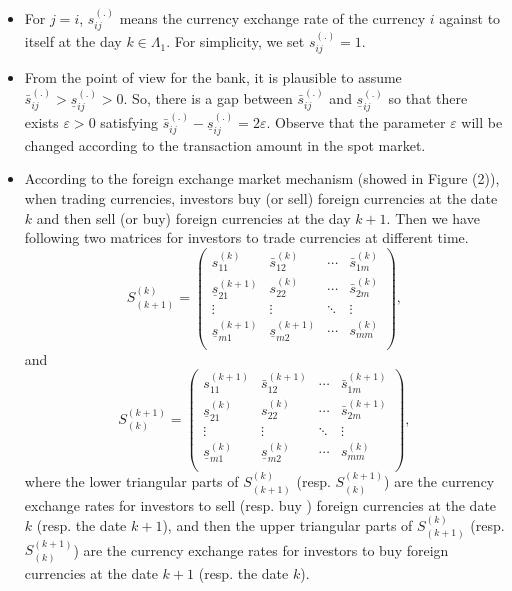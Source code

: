 \documentclass[11pt]{article}
\numberwithin{equation}{section}
\begin{document}
\begin{itemize}
\item For $j=i$, $s_{ij}^{(.)}$ means the currency exchange rate of the currency $i$ against to itself at the day $k\in\Lambda_1.$ For simplicity, we set $s_{ij}^{(.)}=1$. 

\item From the point of view for the bank, it is plausible to assume $\bar s_{ij}^{(.)}> \underline s_{ij}^{(.)}> 0$. So, there is a gap between $\bar s_{ij}^{(.)}$ and $ \underline s_{ij}^{(.)}$ so that  there exists $\varepsilon>0$ satisfying $\bar s_{ij}^{(.)}- \underline s_{ij}^{(.)}=2\varepsilon$. Observe that   the parameter $\varepsilon$ will be changed according to  the transaction amount in the spot market.
    
 \item According to the foreign exchange market mechanism (showed in Figure (2)), when trading currencies,  investors buy (or sell) foreign currencies at the date $k$ and then  sell (or buy) foreign currencies at the day $k+1$. Then we have following two matrices for investors to trade currencies at different time.
	\begin{equation*} 
	S_{(k+1)}^{(k)}= \left(\begin{array}{ccccc}
	s_{11}^{(k)} & \bar s_{12}^{(k)}&\cdots&\bar s_{1m}^{(k)}\\
	\underline s_{21}^{(k+1)} & s_{22}^{(k)}&\cdots&\bar s_{2m}^{(k)}\\
	\vdots & \vdots &\ddots&\vdots\\
	\underline s_{m1}^{(k+1)} &\underline s_{m2}^{(k+1)}&\cdots&s_{mm}^{(k)}\\
	\end{array}
	\right),
	\end{equation*}
	and 
	\begin{equation*} 
	S_{(k)}^{(k+1)}= \left(\begin{array}{ccccc}
	s_{11}^{(k+1)} & \bar s_{12}^{(k+1)}&\cdots&\bar s_{1m}^{(k+1)}\\
	\underline s_{21}^{(k)} & s_{22}^{(k)}&\cdots&\bar s_{2m}^{(k+1)}\\
	\vdots & \vdots &\ddots&\vdots\\
	\underline s_{m1}^{(k)} &\underline s_{m2}^{(k)}&\cdots&s_{mm}^{(k)}\\
	\end{array}
	\right),
	\end{equation*}
where the lower triangular parts of  $S_{(k+1)}^{(k)}$  (resp. $S_{(k)}^{(k+1)} $) are the currency exchange rates for investors to sell (resp. buy ) foreign currencies at the date $k$ (resp. the date $k+1$), and then the upper triangular parts of  $S_{(k+1)}^{(k)}$  (resp. $S_{(k)}^{(k+1)} $) are the currency exchange rates for investors to buy foreign currencies at the date $k+1$ (resp. the date $k$).
	

\end{itemize}
\end{document}
